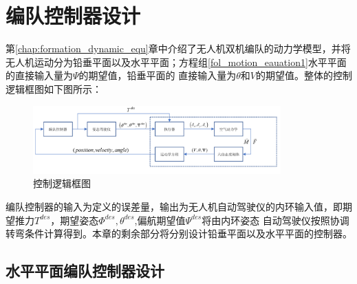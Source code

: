 \chapter{编队控制器设计}
\label{chap:controller_design}
第\ref{chap:formation_dynamic_equ}章中介绍了无人机双机编队的动力学模型，并将无人机运动分为铅垂平面以及水平平面；方程组\ref{fol_motion_eauation1}水平平面的直接输入量为$\Psi$的期望值，铅垂平面的
直接输入量为$\theta$和$V$的期望值。整体的控制逻辑框图如下图所示：
\begin{figure}[H]
    \centering
    \includegraphics[width=0.85\textwidth]{figures/c3/c3-overview_controller.png}
    \caption{控制逻辑框图}\label{fig:c3-overview_controller}
\end{figure}
编队控制器的输入为定义的误差量，输出为无人机自动驾驶仪的内环输入值，即期望推力$T^{des}$，期望姿态$\Phi^{des},\theta^{des}$,偏航期望值$\Psi^{des}$将由内环姿态
自动驾驶仪按照协调转弯条件计算得到。本章的剩余部分将分别设计铅垂平面以及水平平面的控制器。
\section{水平平面编队控制器设计}
